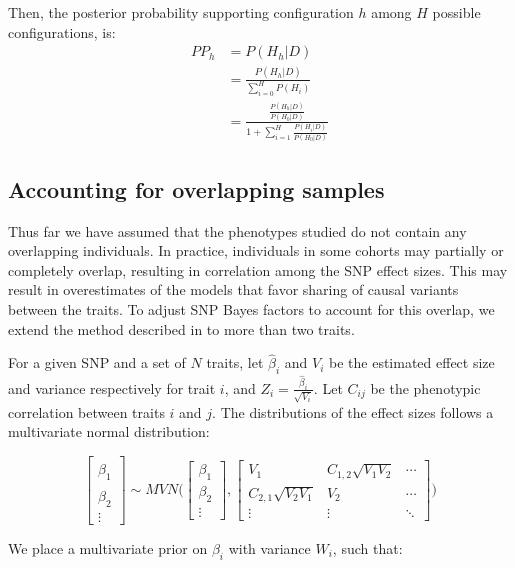 \documentclass{article}
\begin{document}
Then, the posterior probability supporting configuration $h$ among $H$ possible configurations, is:
\begin{align}
PP_h &= P(H_h | D) \\
&= \frac{P(H_h | D)}{\sum_{i=0}^H P(H_i)} \\
&= \frac{\frac{P(H_h | D)}{P(H_0|D)}}{1 + \sum_{i=1}^H \frac{P(H_i|D)}{P(H_0|D)}}
\end{align}

\subsection{Accounting for overlapping samples}
Thus far we have assumed that the phenotypes studied do not contain any overlapping individuals. In practice, individuals in some cohorts may partially or completely overlap, resulting in correlation among the SNP effect sizes. This may result in overestimates of the models that favor sharing of causal variants between the traits. To adjust SNP Bayes factors to account for this overlap, we extend the method described in \cite{Pickrell:2016aa} to more than two traits.

For a given SNP and a set of $N$ traits, let $\hat{\beta}_i$ and $V_i$ be the estimated effect size and variance respectively for trait $i$, and $Z_i = \frac{\hat{\beta}_i}{\sqrt{V_i}}$. Let $C_{ij}$ be the phenotypic correlation between traits $i$ and $j$. The distributions of the effect sizes follows a multivariate normal distribution:

\begin{equation}
\begin{bmatrix}
\hat{\beta}_1 \\
\hat{\beta}_2 \\
\vdots
\end{bmatrix}
\sim MVN \Bigg(
\begin{bmatrix}
\beta_1 \\
\beta_2 \\
\vdots
\end{bmatrix},
\begin{bmatrix}
V_1 & C_{1,2} \sqrt{V_1 V_2} & \cdots \\
C_{2,1} \sqrt{V_2 V_1} & V_2 & \cdots \\
\vdots & \vdots & \ddots
\end{bmatrix}
\Bigg)
\end{equation}

\noindent We place a multivariate prior on $\beta_i$ with variance $W_i$, such that:
\end{document}
